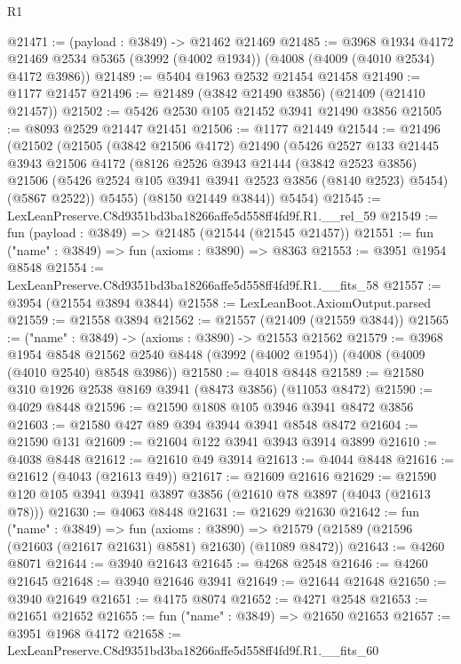 \begin{lexlean}{R1}
\begin{coremodule}
@21471 := (payload : @3849) -> @21462 @21469
@21485 := @3968
    @1934
    @4172
    @21469
    @2534
    @5365
    (@3992 (@4002 @1934))
    (@4008 (@4009 (@4010 @2534) @4172 @3986))
@21489 := @5404 @1963 @2532 @21454 @21458
@21490 := @1177 @21457
@21496 := @21489 (@3842 @21490 @3856) (@21409 (@21410 @21457))
@21502 := @5426 @2530 @105 @21452 @3941 @21490 @3856
@21505 := @8093 @2529 @21447 @21451
@21506 := @1177 @21449
@21544 := @21496
    (@21502
      (@21505
        (@3842 @21506 @4172)
        @21490
        (@5426
          @2527
          @133
          @21445
          @3943
          @21506
          @4172
          (@8126
            @2526
            @3943
            @21444
            (@3842 @2523 @3856)
            @21506
            (@5426 @2524 @105 @3941 @3941 @2523 @3856 (@8140 @2523) @5454)
            (@5867 @2522))
          @5455)
        (@8150 @21449 @3844))
      @5454)
@21545 := LexLeanPreserve.C8d9351bd3ba18266affe5d558ff4fd9f.R1.__rel_59
@21549 := fun (payload : @3849) => @21485 (@21544 (@21545 @21457))
@21551 := fun ("name" : @3849) => fun (axioms : @3890) => @8363
@21553 := @3951 @1954 @8548
@21554 := LexLeanPreserve.C8d9351bd3ba18266affe5d558ff4fd9f.R1.__fits_58
@21557 := @3954 (@21554 @3894 @3844)
@21558 := LexLeanBoot.AxiomOutput.parsed
@21559 := @21558 @3894
@21562 := @21557 (@21409 (@21559 @3844))
@21565 := ("name" : @3849) -> (axioms : @3890) -> @21553 @21562
@21579 := @3968
    @1954
    @8548
    @21562
    @2540
    @8448
    (@3992 (@4002 @1954))
    (@4008 (@4009 (@4010 @2540) @8548 @3986))
@21580 := @4018 @8448
@21589 := @21580 @310 @1926 @2538 @8169 @3941 (@8473 @3856) (@11053 @8472)
@21590 := @4029 @8448
@21596 := @21590 @1808 @105 @3946 @3941 @8472 @3856
@21603 := @21580 @427 @89 @394 @3944 @3941 @8548 @8472
@21604 := @21590 @131
@21609 := @21604 @122 @3941 @3943 @3914 @3899
@21610 := @4038 @8448
@21612 := @21610 @49 @3914
@21613 := @4044 @8448
@21616 := @21612 (@4043 (@21613 @49))
@21617 := @21609 @21616
@21629 := @21590 @120 @105 @3941 @3941 @3897 @3856 (@21610 @78 @3897 (@4043 (@21613 @78)))
@21630 := @4063 @8448
@21631 := @21629 @21630
@21642 := fun ("name" : @3849) =>
  fun (axioms : @3890) =>
  @21579 (@21589 (@21596 (@21603 (@21617 @21631) @8581) @21630) (@11089 @8472))
@21643 := @4260 @8071
@21644 := @3940 @21643
@21645 := @4268 @2548
@21646 := @4260 @21645
@21648 := @3940 @21646 @3941
@21649 := @21644 @21648
@21650 := @3940 @21649
@21651 := @4175 @8074
@21652 := @4271 @2548
@21653 := @21651 @21652
@21655 := fun ("name" : @3849) => @21650 @21653
@21657 := @3951 @1968 @4172
@21658 := LexLeanPreserve.C8d9351bd3ba18266affe5d558ff4fd9f.R1.__fits_60

\end{coremodule}
\end{lexlean}
